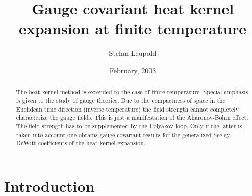 \documentclass[a4paper,showpacs,showkeys,prd,nofootinbib]{revtex4}
\begin{document}
\title{Gauge covariant heat kernel expansion at finite temperature}

\date{February, 2003}

\author{Stefan Leupold}



\begin{abstract}
The heat kernel method is extended to the case of finite temperature. Special emphasis
is given to the study of gauge theories. Due to the
compactness of space in the Euclidean time direction (inverse temperature) the field
strength cannot completely characterize the gauge fields. This is just a
manifestation of the Aharonov-Bohm effect. The field strength has to be supplemented
by the Polyakov loop. Only if the latter is taken into account one obtains gauge
covariant results for the generalized Seeley-DeWitt coefficients of the heat kernel 
expansion.
\end{abstract}

\maketitle


\section{Introduction}
\label{sec:intro}
\end{document}
